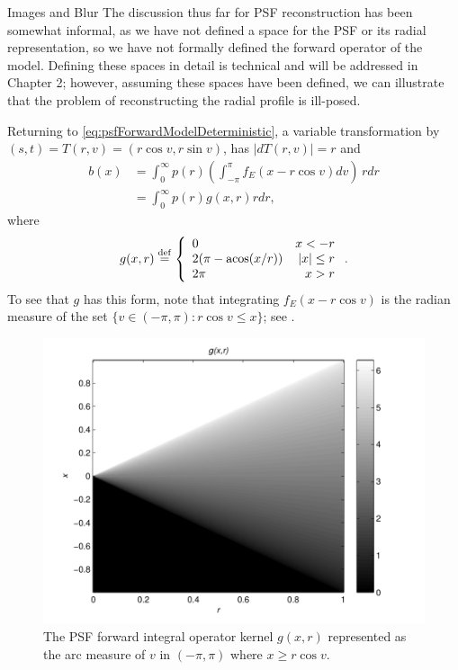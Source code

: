 \begin{chapter}{Images and Blur}
  The discussion thus far for PSF reconstruction has been somewhat informal, as we have not defined a space for the PSF or its radial representation, so we have not formally defined the forward operator of the model.
  Defining these spaces in detail is technical and will be addressed in Chapter 2; however, assuming these spaces have been defined, we can illustrate that the problem of reconstructing the radial profile is ill-posed.

  Returning to \eqref{eq:psfForwardModelDeterministic}, a variable transformation
  by $(s,t) = T(r,v) = (r\cos v,r\sin v)$, has $|dT(r,v)| = r$ and 
  \begin{align}
    b(x) &= \int_0^\infty p(r) \left( \int_{-\pi}^\pi f_E(x - r\cos v)dv \right)\,r dr\nonumber \\
         &= \int_0^\infty p(r) g(x,r) r dr, \label{eq:radialForwardModelDeterministic}
  \end{align}
where
\begin{equation} \label{eq:radialForwardKernel}
  g(x,r) \stackrel{\rm def}{=} \left\{\begin{array}{lr}
    0 & x < - r\\
    2(\pi - \operatorname*{acos}(x/r)) & |x| \le r\\
    2\pi &  x> r
  \end{array}\right..  
\end{equation}
  To see that $g$ has this form, note that integrating $f_E(x-r\cos v)$ is the radian measure of the set $\{v\in(-\pi,\pi): r\cos v \le x\}$; see .  

\begin{figure}
  \begin{center}
  \includegraphics[width=.5\textwidth]{figures/g_function.pdf}
\end{center}
\caption{ The PSF forward integral operator kernel $g(x,r)$ represented as the arc measure of $v$ in $(-\pi,\pi)$ where $x \ge r\cos v$. }\label{fig:radialForwardKernel}
\end{figure}


\end{chapter}
